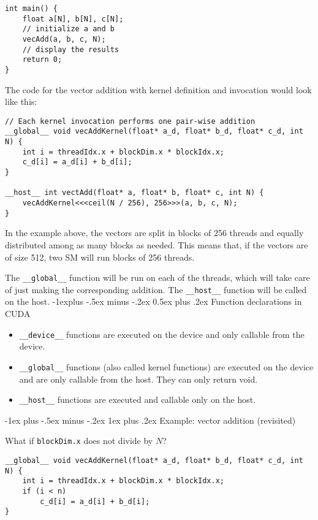\documentclass[10pt,landscape]{article}
\makeatletter
\renewcommand{\subsection}{\@startsection{subsection}{2}{0mm}%
                                {-1explus -.5ex minus -.2ex}%
                                {0.5ex plus .2ex}%
                                {\normalfont\normalsize\bfseries}}
\renewcommand{\subsubsection}{\@startsection{subsubsection}{3}{0mm}%
                                {-1ex plus -.5ex minus -.2ex}%
                                {1ex plus .2ex}%
                                {\normalfont\small\bfseries}}
\makeatother
\begin{document}
\begin{multicols}{3}
\begin{verbatim}
int main() {
    float a[N], b[N], c[N];
    // initialize a and b
    vecAdd(a, b, c, N);
    // display the results
    return 0;
}
\end{verbatim}
\par
The code for the vector addition with kernel definition and invocation would look like this:
\begin{verbatim}
// Each kernel invocation performs one pair-wise addition
__global__ void vecAddKernel(float* a_d, float* b_d, float* c_d, int N) {
    int i = threadIdx.x + blockDim.x * blockIdx.x;
    c_d[i] = a_d[i] + b_d[i];
}

__host__ int vectAdd(float* a, float* b, float* c, int N) {
    vecAddKernel<<<ceil(N / 256), 256>>>(a, b, c, N);
}
\end{verbatim}
\par
In the example above, the vectors are split in blocks of 256 threads and equally distributed among as many blocks as needed. This means that, if the vectors are of size 512, two SM will run blocks of 256 threads.
\par
The \texttt{\_\_global\_\_} function will be run on each of the threads, which will take care of just making the corresponding addition. The \texttt{\_\_host\_\_} function will be called on the host.
\subsection{Function declarations in CUDA}
\begin{itemize}
    \item \texttt{\_\_device\_\_} functions are executed on the device and only callable from the device.
    \item \texttt{\_\_global\_\_} functions (also called kernel functions) are executed on the device and are only callable from the host. They can only return void.
    \item \texttt{\_\_host\_\_} functions are executed and callable only on the host.
\end{itemize}
\subsubsection{Example: vector addition (revisited)}
\par
What if \texttt{blockDim.x} does not divide by $N$?
\begin{verbatim}
__global__ void vecAddKernel(float* a_d, float* b_d, float* c_d, int N) {
    int i = threadIdx.x + blockDim.x * blockIdx.x;
    if (i < n)
        c_d[i] = a_d[i] + b_d[i];
}
\end{verbatim}

\end{multicols}
\end{document}
